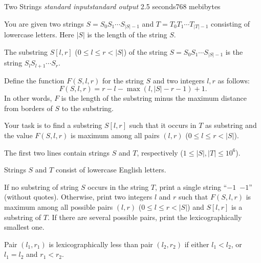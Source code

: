 \gdef\thisproblemauthor{Sergey Kopeliovich}
\gdef\thisproblemdeveloper{Anton Gulikov}

\begin{problem}{Two Strings}
{\textsl{standard input}}{\textsl{standard output}}
{2.5 seconds}{768 mebibytes}{}

You are given two strings $S = S_{0} S_{1} \cdots S_{|S| - 1}$
and $T = T_{0} T_{1} \cdots T_{|T| - 1}$ consisting of lowercase letters.
Here $|S|$ is the length of the string $S$.

The substring $S[l, r]$ ($0 \le l \le r < |S|$) of the string
$S = S_{0} S_{1} \cdots S_{|S|-1}$ is the string $S_{l} S_{l+1} \cdots S_{r}$.

Define the function $F (S, l, r)$ for the string $S$ and two integers $l, r$
as follows:
$$F (S, l, r) = r - l - \max (l, |S| - r - 1) + 1\text{.}$$ 
In other words, $F$ is the length of the substring
minus the maximum distance from borders of $S$ to the substring.

Your task is to find a substring $S[l, r]$ such that it occurs
in $T$ as substring and the value $F (S, l, r)$ is maximum
among all pairs $(l, r)$ ($0 \le l \le r < |S|$).

\InputFile

The first two lines contain strings $S$ and $T$, respectively
($1 \leq |S|, |T| \leq 10^6$).

Strings $S$ and $T$ consist of lowercase English letters.

\OutputFile

If no substring of string $S$ occurs in the string $T$,
print a single string ``\texttt{$-1$~$-1$}'' (without quotes).
Otherwise, print two integers $l$ and $r$ such that $F (S, l, r)$
is maximum among all possible pairs $(l, r)$ ($0 \le l \le r < |S|$)
and $S[l, r]$ is a substring of $T$.
If there are several possible pairs,
print the lexicographically smallest one.

\Examples

\begin{example}
%
%
%
\end{example}

\Note

Pair $(l_1, r_1)$ is lexicographically less than pair $(l_2, r_2)$
if either $l_1 < l_2$, or $l_1 = l_2$ and $r_1 < r_2$. 

\end{problem}
